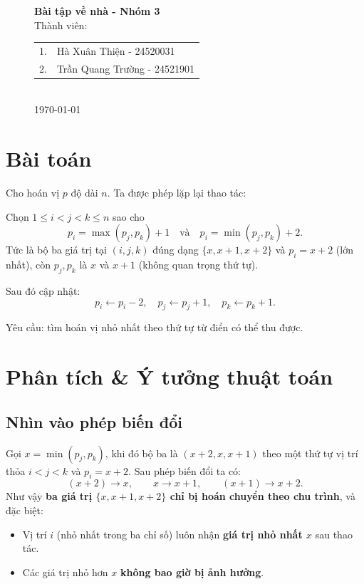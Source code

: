 \documentclass[12pt,a4paper]{article}
\begin{document}
	
\begin{figure}
	\centering
	{\Large \textbf{Bài tập về nhà - Nhóm 3}}\\[1cm]
	{\large Thành viên:}\\[0.2cm]
	\begin{tabular}{ll}
		1. & Hà Xuân Thiện - 24520031 \\
		2. & Trần Quang Trường - 24521901 \\
	\end{tabular}\\[0.5cm]
	{\large \today}
\end{figure}

\section*{Bài toán}
Cho hoán vị $p$ độ dài $n$. Ta được phép lặp lại thao tác:

Chọn $1 \le i < j < k \le n$ sao cho
\[
p_i = \max(p_j,p_k)+1 \quad \text{và} \quad p_i = \min(p_j,p_k)+2.
\]
Tức là bộ ba giá trị tại $(i,j,k)$ đúng dạng $\{x,x+1,x+2\}$ và $p_i=x+2$ (lớn nhất), còn $p_j,p_k$ là $x$ và $x+1$ (không quan trọng thứ tự).

Sau đó cập nhật:
\[
p_i \leftarrow p_i-2,\quad p_j \leftarrow p_j+1,\quad p_k \leftarrow p_k+1.
\]

Yêu cầu: tìm hoán vị nhỏ nhất theo thứ tự từ điển có thể thu được.

\section{Phân tích \& Ý tưởng thuật toán}

\subsection*{Nhìn vào phép biến đổi}
Gọi $x=\min(p_j,p_k)$, khi đó bộ ba là $(x+2, x, x+1)$ theo một thứ tự vị trí thỏa $i<j<k$ và $p_i=x+2$.
Sau phép biến đổi ta có:
\[
(x+2) \to x,\qquad x \to x+1,\qquad (x+1) \to x+2.
\]
Như vậy \textbf{ba giá trị $\{x,x+1,x+2\}$ chỉ bị hoán chuyển theo chu trình}, và đặc biệt:
\begin{itemize}[nosep]
	\item Vị trí $i$ (nhỏ nhất trong ba chỉ số) luôn nhận \textbf{giá trị nhỏ nhất $x$} sau thao tác.
	\item Các giá trị nhỏ hơn $x$ \textbf{không bao giờ bị ảnh hưởng}.
\end{itemize}
\end{document}
